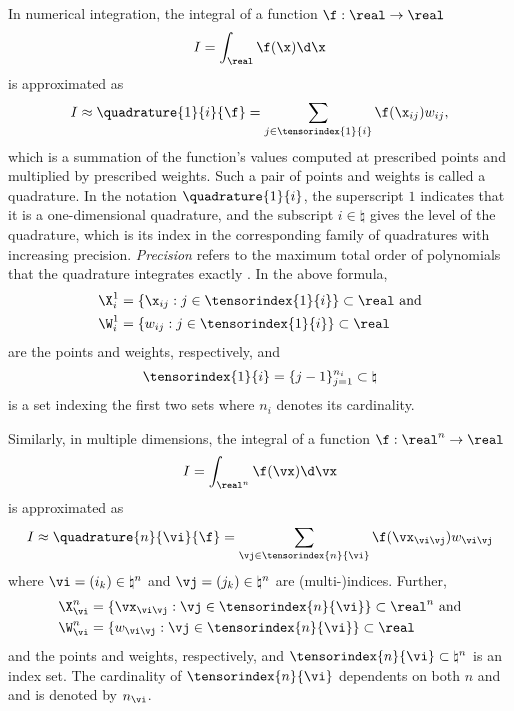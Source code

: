 In numerical integration, the integral of a function $\f: \real \to \real$
\[
  I = \int_\real \f(\x) \d \x
\]
is approximated as
\[
  I \approx \quadrature{1}{i}{\f}
  = \sum_{j \in \tensorindex{1}{i}} \f(\x_{ij}) w_{ij},
\]
which is a summation of the function's values computed at prescribed points and
multiplied by prescribed weights. Such a pair of points and weights is called a
quadrature. In the notation $\quadrature{1}{i}$, the superscript $1$ indicates
that it is a one-dimensional quadrature, and the subscript $i \in \natural$
gives the level of the quadrature, which is its index in the corresponding
family of quadratures with increasing precision. \emph{Precision} refers to the
maximum total order of polynomials that the quadrature integrates exactly
\cite{heiss2008}. In the above formula,
\begin{align*}
  & \X^1_i = \{ \x_{ij}: j \in \tensorindex{1}{i} \} \subset \real \text{ and} \\
  & \W^1_i = \{ w_{ij}: j \in \tensorindex{1}{i} \} \subset \real
\end{align*}
are the points and weights, respectively, and
\[
  \tensorindex{1}{i} = \{ j - 1 \}_{j = 1}^{n_i} \subset \natural
\]
is a set indexing the first two sets where $n_i$ denotes its cardinality.

Similarly, in multiple dimensions, the integral of a function $\f: \real^n \to
\real$
\[
  I = \int_{\real^n} \f(\vx) \d \vx
\]
is approximated as
\[
  I \approx \quadrature{n}{\vi}{\f}
  = \sum_{\vj \in \tensorindex{n}{\vi}} \f(\vx_{\vi \vj}) w_{\vi \vj}
\]
where $\vi = (i_k) \in \natural^n$ and $\vj = (j_k) \in \natural^n$ are
(multi-)indices. Further,
\begin{align*}
  & \X^n_{\vi} = \{ \vx_{\vi \vj}: \vj \in \tensorindex{n}{\vi} \} \subset \real^n \text{ and} \\
  & \W^n_{\vi} = \{ w_{\vi \vj}: \vj \in \tensorindex{n}{\vi} \} \subset \real
\end{align*}
and the points and weights, respectively, and $\tensorindex{n}{\vi} \subset
\natural^n$ is an index set. The cardinality of $\tensorindex{n}{\vi}$
dependents on both $n$ and \vi and is denoted by $n_{\vi}$.

